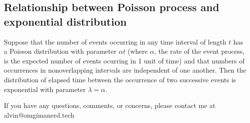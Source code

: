 \documentclass[letterpaper, 12pt]{math}
\begin{document}
\subsection*{Relationship between Poisson process and exponential distribution}
Suppose that the number of events occurring in any time interval of length
\( t \) has a Poisson distribution with parameter \( \alpha t \) (where
\( \alpha \), the rate of the event process, is the expected number of events
ocurring in 1 unit of time) and that numbers of occurrences in nonoverlapping
intervals are independent of one another. Then the distribution of elapsed time
between the occurrence of two successive events is exponential with parameter
\( \lambda = \alpha \).

\begin{center}
  If you have any questions, comments, or concerns, please contact me at
  alvin@omgimanerd.tech
\end{center}
\end{document}
